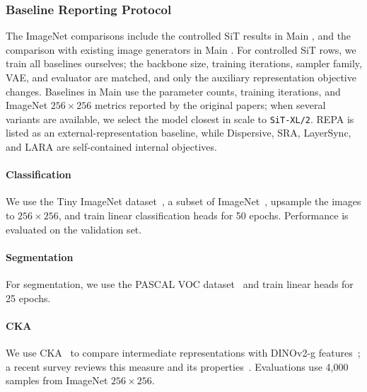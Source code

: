 \subsubsection{Baseline Reporting Protocol}
\label{app:baseline_protocol}

The ImageNet comparisons include the controlled SiT results in Main , and the comparison with existing image generators in Main . For controlled SiT rows, we train all baselines ourselves; the backbone size, training iterations, sampler family, VAE, and evaluator are matched, and only the auxiliary representation objective changes. Baselines in Main  use the parameter counts, training iterations, and ImageNet $256{\times}256$ metrics reported by the original papers; when several variants are available, we select the model closest in scale to \texttt{SiT-XL/2}. REPA is listed as an external-representation baseline, while Dispersive, SRA, LayerSync, and LARA are self-contained internal objectives.

\paragraph{Classification}
We use the Tiny ImageNet dataset~\citep{le2015tiny}, a subset of ImageNet~\citep{deng2009imagenet}, upsample the images to $256\times256$, and train linear classification heads for 50 epochs. Performance is evaluated on the validation set.

\paragraph{Segmentation}
For segmentation, we use the PASCAL VOC dataset~\citep{everingham2010pascal} and train linear heads for 25 epochs.

\paragraph{CKA}
We use CKA~\citep{kornblith2019similarity} to compare intermediate representations with DINOv2-g features~\citep{oquab2023dinov2}; a recent survey reviews this measure and its properties~\citep{klabunde2025similarity}. Evaluations use 4,000 samples from ImageNet $256\times256$.

